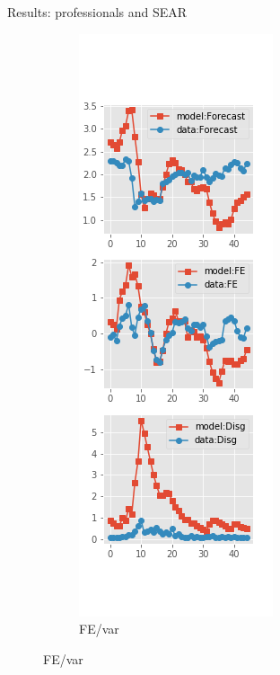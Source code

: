 \documentclass{beamer}
\begin{document}
\begin{frame}{Results: professionals and SEAR}
\begin{figure}[ht]
\begin{subfigure}[b]{0.19\textwidth}
		\end{subfigure}
		\hfill
		\begin{subfigure}[b]{0.19\textwidth}
			\caption{FE/var}
			\includegraphics[width=\textwidth, height = 0.8\textheight]{figuresDraft/spf_se_est_diag3.png}

\end{subfigure}
\end{figure}
\end{frame}
\end{document}
